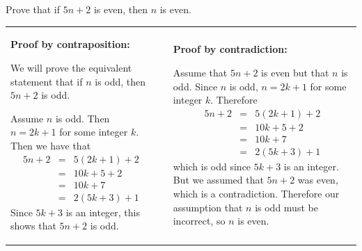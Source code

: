 \begin{exa}
Prove that if $5n+2$ is even, then $n$ is even.

\bigskip 

\noindent
\begin{tabular}{lll}
\begin{minipage}{2.65in}
\noindent
{\bf Proof by contraposition:}

We will prove the equivalent statement that if $n$ is odd, then $5n+2$ is odd.

Assume $n$ is odd.  Then $n=2k+1$ for some integer $k$. Then we have that
\begin{eqnarray*}
5n+2&=&5(2k+1)+2\\
&=&10k+5+2\\
&=&10k+7\\
&=&2(5k+3)+1
\end{eqnarray*}
Since $5k+3$ is an integer, this shows that $5n+2$ is odd.

\bigskip

\bigskip

\end{minipage}
&\, \,
&
\begin{minipage}{2.65in}
{\bf Proof by contradiction:}

Assume that $5n+2$ is even but that $n$ is odd.
Since $n$ is odd, $n=2k+1$ for some integer $k$.
Therefore 
\begin{eqnarray*}
5n+2&=&5(2k+1)+2\\
&=&10k+5+2\\
&=&10k+7\\
&=&2(5k+3)+1
\end{eqnarray*}
which is odd since $5k+3$ is an integer.  
But we assumed that $5n+2$ was even, which is a contradiction.
Therefore our assumption that $n$ is odd must be incorrect, so $n$ is even.
\end{minipage}
\end{tabular}
\end{exa}

